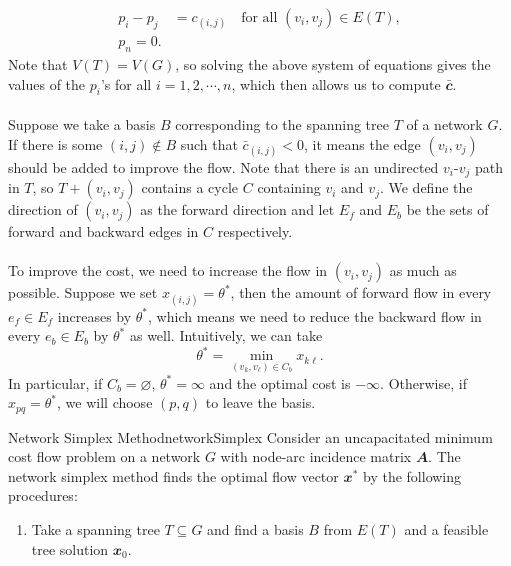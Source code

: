 \documentclass[math, code]{amznotes}
\theoremstyle{remark}
\begin{document}
\begin{align*}
    p_i - p_j & = c_{(i, j)} \quad \textrm{for all } (v_i, v_j) \in E(T), \\
    p_n = 0.
\end{align*}
Note that $V(T) = V(G)$, so solving the above system of equations gives the values of the $p_i$'s for all $i = 1, 2, \cdots, n$, which then allows us to compute $\bar{\mathbfit{c}}$.
\\\\
Suppose we take a basis $B$ corresponding to the spanning tree $T$ of a network $G$. If there is some $(i, j) \notin B$ such that $\bar{c}_{(i, j)} < 0$, it means the edge $(v_i, v_j)$ should be added to improve the flow. Note that there is an undirected $v_i$-$v_j$ path in $T$, so $T + (v_i, v_j)$ contains a cycle $C$ containing $v_i$ and $v_j$. We define the direction of $(v_i, v_j)$ as the forward direction and let $E_f$ and $E_b$ be the sets of forward and backward edges in $C$ respectively. 
\\\\
To improve the cost, we need to increase the flow in $(v_i, v_j)$ as much as possible. Suppose we set $x_{(i, j)} = \theta^*$, then the amount of forward flow in every $e_f \in E_f$ increases by $\theta^*$, which means we need to reduce the backward flow in every $e_b \in E_b$ by $\theta^*$ as well. Intuitively, we can take 
\begin{equation*}
    \theta^* = \min_{(v_k, v_{\ell}) \in C_b}x_{k\ell}.
\end{equation*}
In particular, if $C_b = \varnothing$, $\theta^* = \infty$ and the optimal cost is $-\infty$. Otherwise, if $x_{pq} = \theta^*$, we will choose $(p, q)$ to leave the basis.
\begin{tecbox}{Network Simplex Method}{networkSimplex}
    Consider an uncapacitated minimum cost flow problem on a network $G$ with node-arc incidence matrix $\mathbfit{A}$. The network simplex method finds the optimal flow vector $\mathbfit{x}^*$ by the following procedures:
    \begin{enumerate}
        \item Take a spanning tree $T \subseteq G$ and find a basis $B$ from $E(T)$ and a feasible tree solution $\mathbfit{x}_0$.
    \end{enumerate}
\end{tecbox}
\end{document}
